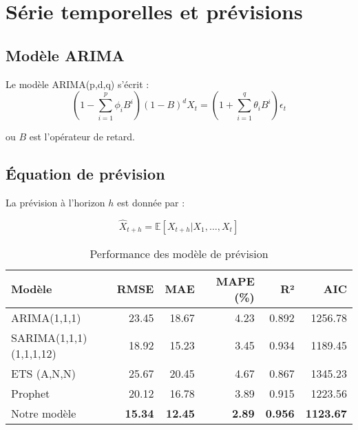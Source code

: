 \section{Série temporelles et prévisions}
\subsection{Modèle ARIMA}
Le modèle ARIMA(p,d,q) s'écrit : 
\begin{equation}
	(1 - \sum_{i=1}^p \phi_iB^i)(1 - B)^d X_t = (1 + \sum_{i=1}^q \theta_i B^i) \epsilon_t 
	\label{eq:arima-model}
\end{equation}

ou $B$ est l'opérateur de retard.

\subsection{Équation de prévision}

La prévision à l'horizon $h$ est donnée par : 

\begin{equation}
	\hat{X}_{t+h} = \mathbb{E}[X_{t+h} | X_1, \dots, X_t]
	\label{eq:forest-equation}
\end{equation}

\begin{table}[H]
	\centering
	\caption{Performance des modèle de prévision}
	\begin{tabular}{lrrrrr}
		\toprule
		\textbf{Modèle} & \textbf{RMSE} & \textbf{MAE} & \textbf{MAPE (\%)} & \textbf{R²} & \textbf{AIC} \\
		\midrule
		ARIMA(1,1,1) & 23.45 & 18.67 & 4.23 & 0.892 & 1256.78 \\
		SARIMA(1,1,1)(1,1,1,12) & 18.92 & 15.23 & 3.45 & 0.934 & 1189.45 \\
		ETS (A,N,N) & 25.67 & 20.45 & 4.67 & 0.867 & 1345.23 \\
		Prophet & 20.12 & 16.78 &  3.89 & 0.915 & 1223.56 \\
		Notre modèle & \textbf{15.34} & \textbf{12.45} & \textbf{2.89} & \textbf{0.956} & \textbf{1123.67} \\
		\bottomrule
	\end{tabular}
	\label{tab:forest-performance}
\end{table}




































